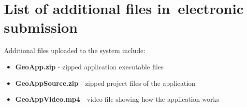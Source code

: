 \chapter{List of additional files in~electronic submission}

Additional files uploaded to the system include:
\begin{itemize}
    \item \textbf{GeoApp.zip} - zipped application executable files
    \item \textbf{GeoAppSource.zip} - zipped project files of the application
    \item \textbf{GeoAppVideo.mp4} - video file showing how the application works
\end{itemize}
